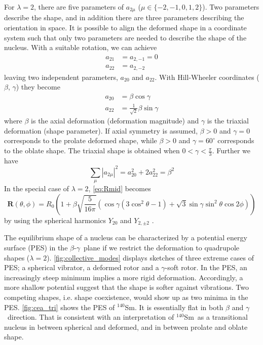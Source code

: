 \documentclass[twoside,english]{uiofysmaster/uiofysmaster}
\newcommand{\Sm}{$^{140}$Sm} %
\newcommand{\ga}{$\gamma$}
\let\orgautoref\autoref
\renewcommand{\autoref}
        {%
		 \def\sectionautorefname{Section}%
		 \def\subsectionautorefname{Section}%
		 \def\subsubsectionautorefname{Section}%
		 \def\chapterautorefname{Chapter}%
          \orgautoref}
\begin{document}
For $\lambda = 2$, there are five parameters of $a_{2\mu}$ ($\mu \in \{ -2, -1, 0, 1, 2 \}$). 
Two parameters describe the shape, and in addition there are three parameters describing the orientation in space. %
It is possible to align the deformed shape in a coordinate system such that only two parameters are needed to describe the shape of the nucleus.
With a suitable rotation, we can achieve 
\begin{align*}
	a_{21} &=  a_{2,-1} = 0 \\
	a_{22} &= a_{2,-2} 
\end{align*}
leaving two independent parameters, $a_{20}$ and $a_{22}$. 
With Hill-Wheeler \cite{Hill-Wheeler} coordinates ($\beta$, $\gamma$) they become
\begin{align}
	a_{20} &= \beta \cos \gamma \label{eq:a-param1} \\
	a_{22} &= \frac{1}{\sqrt{2}} \beta \sin \gamma \label{eq:a-param2}
\end{align}
where $\beta$ is the axial deformation (deformation magnitude) and $\gamma$ is the triaxial deformation (shape parameter). 
If axial symmetry is assumed, $\beta > 0$ and $\gamma = 0$ corresponds to the prolate deformed shape, while $\beta > 0$ and $\gamma = 60^\circ$ corresponds to the oblate shape. 
The triaxial shape is obtained when $0 < \gamma < \tfrac{\pi}{3}$.
Further we have
\begin{equation}
	\sum_\mu | a_{2\mu} |^2 = a_{20}^2 + 2a_{22}^2 = \beta^2
\end{equation}
In the special case of $\lambda = 2$, \autoref{eq:Rmid} becomes
\begin{equation}
	\mathbf{R}(\theta, \phi) = R_0 \left( 1 + \beta \sqrt{\frac{5}{16\pi}} (\cos \gamma (3\cos^2 \theta - 1) + \sqrt{3} \sin \gamma \sin^2 \theta \cos 2\phi) \right)
\end{equation}
by using the spherical harmonics $Y_{20}$ and $Y_{2,\pm 2}$ \cite{RS}.

The equilibrium shape of a nucleus can be characterized by a potential energy surface (PES) in the $\beta$-\ga\ plane if we restrict the deformation to quadrupole shapes ($\lambda = 2$). 
\autoref{fig:collective_modes} displays sketches of three extreme cases of PES; a spherical vibrator, a deformed rotor and a \ga-soft rotor.
In the PES, an increasingly steep minimum implies a more rigid deformation. 
Accordingly, a more shallow potential suggest that the shape is softer against vibrations. 
Two competing shapes, i.e. shape coexistence, would show up as two minima in the PES. 
\autoref{fig:cea_tri} shows the PES of \Sm.
It is essentially flat in both $\beta$ and \ga\ direction. 
That is consistent with an interpretation of \Sm\ as a transitional nucleus in between spherical and deformed, and in between prolate and oblate shape. 
\end{document}
